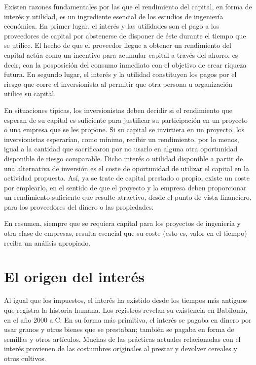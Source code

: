 \documentclass[
]{krantz}
\begin{document}
Existen razones fundamentales por las que el rendimiento del capital, en forma de interés y utilidad, es un ingrediente esencial de los estudios de ingeniería económica. En primer lugar, el interés y las utilidades son el pago a los proveedores de capital por abstenerse de disponer de éste durante el tiempo que se utilice. El hecho de que el proveedor llegue a obtener un rendimiento del capital actúa como un incentivo para acumular capital a través del ahorro, es decir, con la posposición del consumo inmediato con el objetivo de crear riqueza futura. En segundo lugar, el interés y la utilidad constituyen los pagos por el riesgo que corre el inversionista al permitir que otra persona u organización utilice su capital.

En situaciones típicas, los inversionistas deben decidir si el rendimiento que esperan de su capital es suficiente para justificar su participación en un proyecto o una empresa que se les propone. Si su capital se invirtiera en un proyecto, los inversionistas esperarían, como mínimo, recibir un rendimiento, por lo menos, igual a la cantidad que sacrificaron por no usarlo en alguna otra oportunidad disponible de riesgo comparable. Dicho interés o utilidad disponible a partir de una alternativa de inversión es el coste de oportunidad de utilizar el capital en la actividad propuesta. Así, ya se trate de capital prestado o propio, existe un coste por emplearlo, en el sentido de que el proyecto y la empresa deben proporcionar un rendimiento suficiente que resulte atractivo, desde el punto de vista financiero, para los proveedores del dinero o las propiedades.

En resumen, siempre que se requiera capital para los proyectos de ingeniería y otra clase de empresas, resulta esencial que su coste (esto es, valor en el tiempo) reciba un análisis apropiado.

\hypertarget{el-origen-del-interuxe9s}{%
\section{El origen del interés}\label{el-origen-del-interuxe9s}}

Al igual que los impuestos, el interés ha existido desde los tiempos más antiguos que registra la historia humana. Los registros revelan su existencia en Babilonia, en el año 2000 a.C. En su forma más primitiva, el interés se pagaba en dinero por usar granos y otros bienes que se prestaban; también se pagaba en forma de semillas y otros artículos. Muchas de las prácticas actuales relacionadas con el interés provienen de las costumbres originales al prestar y devolver cereales y otros cultivos.
\end{document}
